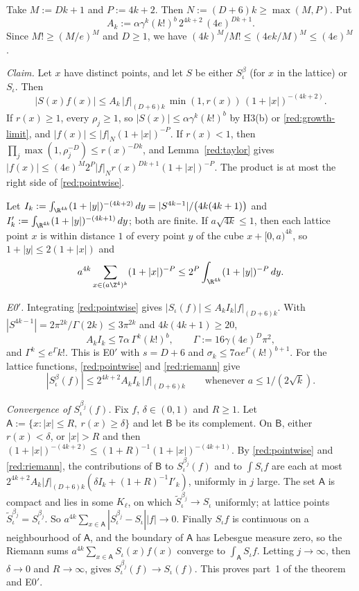 Take $M:=Dk+1$ and $P:=4k+2$. Then $N:=(D+6)k\ge\max(M,P)$. Put
\[
  A_k:=\alpha\gamma^k(k!)^b\,2^{4k+2}\,(4e)^{Dk+1}.
\]
Since $M!\ge(M/e)^M$ and $D\ge1$, we have $(4k)^M/M!\le(4ek/M)^M\le(4e)^{M}$.

\emph{Claim.} Let $x$ have distinct points, and let $S$ be either $S^\beta_\iota$ (for $x$ in the lattice) or $S_\iota$. Then
\begin{equation}\label{red:pointwise}
  |S(x)f(x)|\le A_k\,|f|_{(D+6)k}\,\min(1,r(x))\,(1+|x|)^{-(4k+2)} .
\end{equation}
If $r(x)\ge1$, every $\rho_j\ge1$, so $|S(x)|\le\alpha\gamma^k(k!)^b$ by H3(b) or \eqref{red:growth-limit}, and $|f(x)|\le|f|_N(1+|x|)^{-P}$. If $r(x)<1$, then $\prod_j\max(1,\rho_j^{-D})\le r(x)^{-Dk}$, and Lemma~\ref{red:taylor} gives $|f(x)|\le(4e)^M2^P|f|_Nr(x)^{Dk+1}(1+|x|)^{-P}$. The product is at most the right side of \eqref{red:pointwise}.

Let $I_k:=\int_{\R^{4k}}(1+|y|)^{-(4k+2)}\,dy=|S^{4k-1}|/\bigl(4k(4k+1)\bigr)$ and $I'_k:=\int_{\R^{4k}}(1+|y|)^{-(4k+1)}\,dy$; both are finite. If $a\sqrt{4k}\le1$, then each lattice point $x$ is within distance $1$ of every point $y$ of the cube $x+[0,a)^{4k}$, so $1+|y|\le2(1+|x|)$ and
\begin{equation}\label{red:riemann}
  a^{4k}\sum_{x\in(a\Z^4)^k}(1+|x|)^{-P}\le2^P\int_{\R^{4k}}(1+|y|)^{-P}\,dy .
\end{equation}

\emph{E0$'$.} Integrating \eqref{red:pointwise} gives $|S_\iota(f)|\le A_kI_k|f|_{(D+6)k}$. With $|S^{4k-1}|=2\pi^{2k}/\Gamma(2k)\le3\pi^{2k}$ and $4k(4k+1)\ge20$,
\[
  A_kI_k\le7\alpha\,\Gamma^k(k!)^b,\qquad \Gamma:=16\gamma(4e)^D\pi^2,
\]
and $\Gamma^k\le e^\Gamma k!$. This is E0$'$ with $s=D+6$ and $\sigma_k\le7\alpha e^{\Gamma}(k!)^{b+1}$. For the lattice functions, \eqref{red:pointwise} and \eqref{red:riemann} give
\begin{equation}\label{red:uniform}
  |S^\beta_\iota(f)|\le2^{4k+2}A_kI_k\,|f|_{(D+6)k}\qquad\text{whenever }a\le1/(2\sqrt k).
\end{equation}

\emph{Convergence of $S^{\beta_j}_\iota(f)$.} Fix $f$, $\delta\in(0,1)$ and $R\ge1$. Let $\mathsf A:=\{x:|x|\le R,\ r(x)\ge\delta\}$ and let $\mathsf B$ be its complement. On $\mathsf B$, either $r(x)<\delta$, or $|x|>R$ and then $(1+|x|)^{-(4k+2)}\le(1+R)^{-1}(1+|x|)^{-(4k+1)}$. By \eqref{red:pointwise} and \eqref{red:riemann}, the contributions of $\mathsf B$ to $S^{\beta_j}_\iota(f)$ and to $\int S_\iota f$ are each at most $2^{4k+2}A_k|f|_{(D+6)k}(\delta I_k+(1+R)^{-1}I'_k)$, uniformly in $j$ large. The set $\mathsf A$ is compact and lies in some $K_\ell$, on which $\tilde S^{\beta_j}_\iota\to S_\iota$ uniformly; at lattice points $\tilde S^{\beta_j}_\iota=S^{\beta_j}_\iota$. So $a^{4k}\sum_{x\in\mathsf A}|S^{\beta_j}_\iota-S_\iota||f|\to0$. Finally $S_\iota f$ is continuous on a neighbourhood of $\mathsf A$, and the boundary of $\mathsf A$ has Lebesgue measure zero, so the Riemann sums $a^{4k}\sum_{x\in\mathsf A}S_\iota(x)f(x)$ converge to $\int_{\mathsf A}S_\iota f$. Letting $j\to\infty$, then $\delta\to0$ and $R\to\infty$, gives $S^{\beta_j}_\iota(f)\to S_\iota(f)$. This proves part~1 of the theorem and E0$'$.

